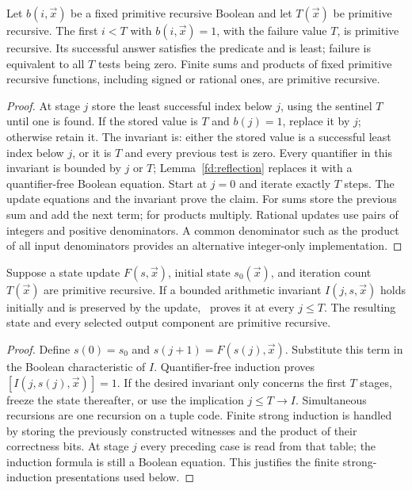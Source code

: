 \begin{lemma}\label{fd:search}
Let $b(i,\vec x)$ be a fixed primitive recursive Boolean and let $T(\vec x)$ be primitive recursive. The first $i<T$ with $b(i,\vec x)=1$, with the failure value $T$, is primitive recursive. Its successful answer satisfies the predicate and is least; failure is equivalent to all $T$ tests being zero. Finite sums and products of fixed primitive recursive functions, including signed or rational ones, are primitive recursive.
\end{lemma}
\begin{proof}
At stage $j$ store the least successful index below $j$, using the sentinel $T$ until one is found. If the stored value is $T$ and $b(j)=1$, replace it by $j$; otherwise retain it. The invariant is: either the stored value is a successful least index below $j$, or it is $T$ and every previous test is zero. Every quantifier in this invariant is bounded by $j$ or $T$; Lemma~\ref{fd:reflection} replaces it with a quantifier-free Boolean equation. Start at $j=0$ and iterate exactly $T$ steps. The update equations and the invariant prove the claim. For sums store the previous sum and add the next term; for products multiply. Rational updates use pairs of integers and positive denominators. A common denominator such as the product of all input denominators provides an alternative integer-only implementation.
\end{proof}

\begin{lemma}\label{fd:loops}
Suppose a state update $F(s,\vec x)$, initial state $s_0(\vec x)$, and iteration count $T(\vec x)$ are primitive recursive. If a bounded arithmetic invariant $I(j,s,\vec x)$ holds initially and is preserved by the update, \ipra\ proves it at every $j\le T$. The resulting state and every selected output component are primitive recursive.
\end{lemma}
\begin{proof}
Define $s(0)=s_0$ and $s(j+1)=F(s(j),\vec x)$. Substitute this term in the Boolean characteristic of $I$. Quantifier-free induction proves $[I(j,s(j),\vec x)]=1$. If the desired invariant only concerns the first $T$ stages, freeze the state thereafter, or use the implication $j\le T\to I$. Simultaneous recursions are one recursion on a tuple code. Finite strong induction is handled by storing the previously constructed witnesses and the product of their correctness bits. At stage $j$ every preceding case is read from that table; the induction formula is still a Boolean equation. This justifies the finite strong-induction presentations used below.
\end{proof}

